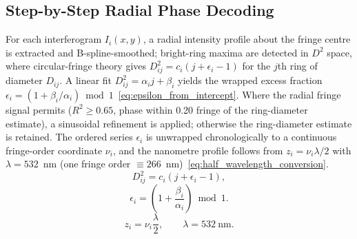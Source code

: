 \documentclass[review]{elsarticle}
\begin{document}
\subsection{Step-by-Step Radial Phase Decoding}
For each interferogram $I_i(x,y)$, a radial intensity profile about the fringe centre is extracted and B-spline-smoothed; bright-ring maxima are detected in $D^2$ space, where circular-fringe theory gives $D_{ij}^{2}=c_i(j+\epsilon_i-1)$ for the $j$th ring of diameter $D_{ij}$. A linear fit $D_{ij}^{2}=\alpha_i j+\beta_i$ yields the wrapped excess fraction $\epsilon_i=(1+\beta_i/\alpha_i)\bmod 1$~\eqref{eq:epsilon_from_intercept}. Where the radial fringe signal permits ($R^2\geq0.65$, phase within 0.20 fringe of the ring-diameter estimate), a sinusoidal refinement is applied; otherwise the ring-diameter estimate is retained. The ordered series $\epsilon_i$ is unwrapped chronologically to a continuous fringe-order coordinate $\nu_i$, and the nanometre profile follows from $z_i=\nu_i\lambda/2$ with $\lambda=532$~nm (one fringe order $\equiv 266$~nm)~\eqref{eq:half_wavelength_conversion}.
\begin{equation}
D_{ij}^{2}=c_i(j+\epsilon_i-1),
\label{eq:ring_diameter_relation}
\end{equation}
\begin{equation}
\epsilon_i=\left(1+\frac{\beta_i}{\alpha_i}\right)\bmod 1.
\label{eq:epsilon_from_intercept}
\end{equation}
\begin{equation}
z_i=\nu_i\frac{\lambda}{2}, \qquad \lambda=532~\mathrm{nm}.
\label{eq:half_wavelength_conversion}
\end{equation}
\end{document}
